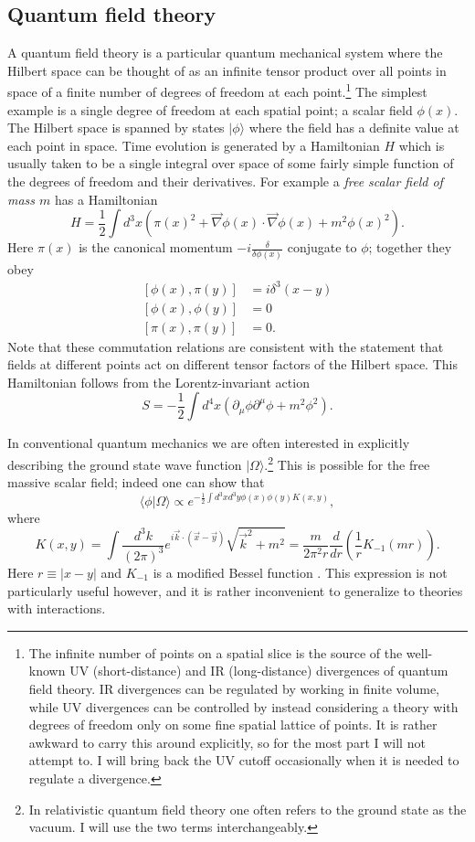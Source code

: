 \documentclass[12pt]{article}
\newcommand{\be}{\begin{equation}}
\newcommand{\ee}{\end{equation}}
\newcommand{\lan}{\langle}
\newcommand{\ran}{\rangle}
\begin{document}
\subsection{Quantum field theory}\label{qftrevsec}

 A quantum field theory is a particular quantum mechanical system where the Hilbert space can be thought of as an infinite tensor product over all points in space of a finite number of degrees of freedom at each point.\footnote{The infinite number of points on a spatial slice is the source of the well-known UV (short-distance) and IR (long-distance) divergences of quantum field theory.  IR divergences can be regulated by working in finite volume, while UV divergences can be controlled by instead considering a theory with degrees of freedom only on some fine spatial lattice of points.  It is rather awkward to carry this around explicitly, so for the most part I will not attempt to.  I will bring back the UV cutoff occasionally when it is needed to regulate a divergence.}  The simplest example is a single degree of freedom at each spatial point; a scalar field $\phi(x)$.  The Hilbert space is spanned by states $|\phi\ran$ where the field has a definite value at each point in space.  Time evolution is generated by a Hamiltonian $H$ which is usually taken to be a single integral over space of some fairly simple function of the degrees of freedom and their derivatives.  For example a \textit{free scalar field of mass $m$} has a Hamiltonian
\be
H=\frac{1}{2}\int d^3 x \left(\pi(x)^2+\vec{\nabla}\phi(x)\cdot \vec{\nabla}\phi(x)+m^2\phi(x)^2\right).
\ee
Here $\pi(x)$ is the canonical momentum $-i\frac{\delta}{\delta \phi(x)}$ conjugate to $\phi$; together they obey
\begin{align}\nonumber
[\phi(x),\pi(y)]&=i\delta^3(x-y)\\\nonumber
[\phi(x),\phi(y)]&=0\\
[\pi(x),\pi(y)]&=0.
\end{align}
Note that these commutation relations are consistent with the statement that fields at different points act on different tensor factors of the Hilbert space.  This Hamiltonian follows from the Lorentz-invariant action
\be
S=-\frac{1}{2}\int d^4x \left(\partial_\mu \phi \partial^\mu \phi+m^2 \phi^2\right).
\ee

In conventional quantum mechanics we are often interested in explicitly describing the ground state wave function $|\Omega\ran$.\footnote{In relativistic quantum field theory one often refers to the ground state as the vacuum.  I will use the two terms interchangeably.}  This is possible for the free massive scalar field; indeed one can show \cite{Weinberg:1995mt} that
\be\label{freevac}
\lan\phi|\Omega\ran\propto e^{-\frac{1}{2}\int d^3x d^3y \phi(x)\phi(y)K(x,y)},
\ee
where 
\be
K(x,y)=\int \frac{d^3 k}{(2\pi)^3}e^{i \vec{k}\cdot (\vec{x}-\vec{y})}\sqrt{\vec{k}^2+m^2}=\frac{m}{2\pi^2r}\frac{d}{dr}\left(\frac{1}{r}K_{-1}(mr)\right).
\ee
Here $r\equiv|x-y|$ and $K_{-1}$ is a modified Bessel function \cite{abramowitz1964handbook}.  This expression is not particularly useful however, and it is rather inconvenient to generalize to theories with interactions.
\end{document}

